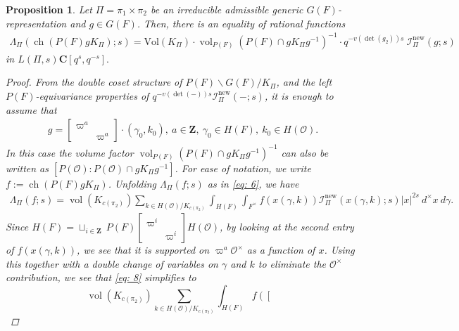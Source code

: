\documentclass{amsart}
\theoremstyle{plain}
\newtheorem{prop}[thm]{Proposition}
\theoremstyle{plain}
\theoremstyle{remark}
\DeclareMathOperator{\ch}{ch}
\DeclareMathOperator{\vol}{vol}
\begin{document}
\begin{prop}\label{prop lambda on char functions}
    Let $\Pi=\pi_1\times \pi_2$ be an irreducible admissible generic $G(F)$-representation and $g\in G(F)$. Then, there is an equality of rational functions
    \begin{align}
        \Lambda_\Pi\left(\ch(P(F) g K_\Pi);s\right)=\mathrm{Vol}(K_\Pi)\cdot \vol_{P(F)}(P(F)\cap gK_\Pi g^{-1})^{-1}\cdot q^{-v(\det(g_2))s}\ \mathcal{I}_\Pi^\mathrm{new}(g;s) 
    \end{align}
    in $L(\Pi,s)\mathbf{C}[q^s,q^{-s}].$
    \begin{proof}
       From the double coset structure of  $P(F)\backslash G(F)/K_\Pi$, and the left $P(F)$-equivariance properties of $q^{-v(\det(-))s}\mathcal{I}_\Pi^\mathrm{new}(-;s)$, it is enough to assume that \begin{align}\label{eq: 2.1.4(1)}g=\left[\begin{smallmatrix}
           \varpi^a &\\
           & \varpi^a
       \end{smallmatrix}\right]\cdot(\gamma_0,k_0),\ a\in\mathbf{Z},\ \gamma_0\in H(F),\ k_0\in H(\mathcal{O}).\end{align}
       In this case the volume factor $\vol_{P(F)}(P(F)\cap gK_\Pi g^{-1})^{-1}$ can also be written as $[P(\mathcal{O}):P(\mathcal{O})\cap gK_\Pi g^{-1}]$. 
       For ease of notation, we write $f:=\ch(P(F) g K_\Pi)$. Unfolding $\Lambda_\Pi(f;s)$ as in \eqref{eq: 6}, we have 
       \begin{align}\label{eq: 8}
           {\Lambda_\Pi(f;s)=\vol(K_{c(\pi_2)})\sum_{k\in H(\mathcal{O})/K_{c(\pi_2)}}\int_{H(F)}\int_{F^\times} f(x(\gamma,k)) \mathcal{I}_\Pi^\mathrm{new}(x(\gamma,k);s)|x|^{2s}\ d^\times x\ d\gamma.}
       \end{align}
       Since $H(F)=\sqcup_{i\in\mathbf{Z} }\ P(F)\left[\begin{smallmatrix}
           \varpi^i & \\
           & \varpi^i
       \end{smallmatrix}\right] H(\mathcal{O})$, by looking at the second entry of $f(x(\gamma,k))$, we see that it is supported on $\varpi^a\mathcal{O}^\times$ as a function of $x$. Using this together  with a double change of variables on $\gamma$ and $k$ to eliminate the $\mathcal{O}^\times$ contribution, we see that \eqref{eq: 8} simplifies to
       $${\vol(K_{c(\pi_2)})\sum_{k\in H(\mathcal{O})/K_{c(\pi_2)}}\int_{H(F)} f\left(\left[\begin{smallmatrix}

\end{smallmatrix}}$$
\end{proof}
\end{prop}
\end{document}

